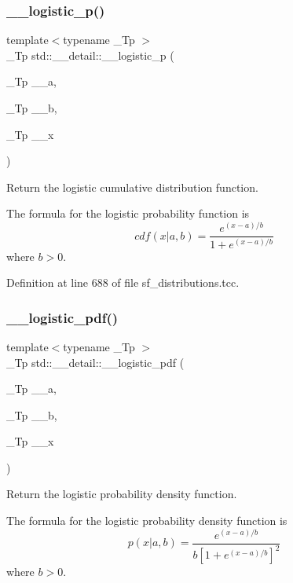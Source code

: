 \subsubsection{\texorpdfstring{\+\_\+\+\_\+logistic\+\_\+p()}{\_\_logistic\_p()}}
{\footnotesize\ttfamily template$<$typename \+\_\+\+Tp $>$ \\
\+\_\+\+Tp std\+::\+\_\+\+\_\+detail\+::\+\_\+\+\_\+logistic\+\_\+p (\begin{DoxyParamCaption}\item[{\+\_\+\+Tp}]{\+\_\+\+\_\+a,  }\item[{\+\_\+\+Tp}]{\+\_\+\+\_\+b,  }\item[{\+\_\+\+Tp}]{\+\_\+\+\_\+x }\end{DoxyParamCaption})}



Return the logistic cumulative distribution function. 

The formula for the logistic probability function is \[ cdf(x| a, b) = \frac{e^{(x - a)/b}}{1 + e^{(x - a)/b}} \] where $b > 0$. 

Definition at line 688 of file sf\+\_\+distributions.\+tcc.

\mbox{\label{namespacestd_1_1____detail_a4c845b9f17fc3e35dccc0954d82d62f9}} 
\subsubsection{\texorpdfstring{\+\_\+\+\_\+logistic\+\_\+pdf()}{\_\_logistic\_pdf()}}
{\footnotesize\ttfamily template$<$typename \+\_\+\+Tp $>$ \\
\+\_\+\+Tp std\+::\+\_\+\+\_\+detail\+::\+\_\+\+\_\+logistic\+\_\+pdf (\begin{DoxyParamCaption}\item[{\+\_\+\+Tp}]{\+\_\+\+\_\+a,  }\item[{\+\_\+\+Tp}]{\+\_\+\+\_\+b,  }\item[{\+\_\+\+Tp}]{\+\_\+\+\_\+x }\end{DoxyParamCaption})}



Return the logistic probability density function. 

The formula for the logistic probability density function is \[ p(x| a, b) = \frac{e^{(x - a)/b}}{b[1 + e^{(x - a)/b}]^2} \] where $b > 0$. 

